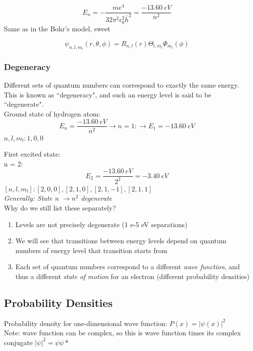 \documentclass[class=article,crop=false]{standalone}
\begin{document}
\begin{result}
	$$ E_n = -\frac{me^4}{32\pi^2\epsilon_0^2\bar{h}^2} = \frac{-13.60\ eV}{n^2} $$
	Same as in the Bohr's model, sweet \\
\end{result}

\begin{result}
	$$ \psi_{n, l, m_l}(r, \theta, \phi) = R_{n,l}(r) \Theta_{l, m_l} \Phi_{m_l}(\phi) $$
\end{result}

\subsubsection{Degeneracy}
Different sets of quantum numbers can correspond to exactly the same energy. This is known as ``degeneracy", and such an energy level is said to be ``degenerate". \\

Ground state of hydrogen atom:
$$ E_n = \frac{-13.60\ eV}{n^2} \rightarrow n = 1: \rightarrow E_1 = -13.60\ eV $$
$n, l, m_l: 1, 0, 0$

First excited state:\\
n = 2:
$$ E_2 = \frac{-13.60\ eV}{2^2} = -3.40\ eV $$
$[n, l, m_l]: [2, 0, 0],[2, 1, 0],[2, 1, -1], [2, 1, 1] $ \\
\emph{Generally: State n $\rightarrow n^2$ degenerate} \\

Why do we still list these separately?
\begin{enumerate}
	\item Levels are not precisely degenerate (1 e-5 eV separations)
	\item We will see that transitions between energy levels depend on quantum numbers of energy level that transition starts from
	\item Each set of quantum numbers correspond to a different \emph{wave function}, and thus a different \emph{state of motion} for an electron (different probability densities)
\end{enumerate}

\subsection{Probability Densities}
Probability density for one-dimensional wave function: $P(x) = |\psi(x)|^2$ \\
Note: wave function can be complex, so this is wave function times its complex conjugate $ |\psi|^2 = \psi\psi*$ \\
\end{document}
